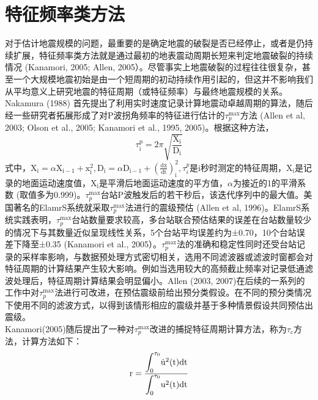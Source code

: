 \section{特征频率类方法}
\indent 对于估计地震规模的问题，最重要的是确定地震的破裂是否已经停止，或者是仍持续扩展，特征频率类方法就是通过最初的地表震动周期长短来判定地震破裂的持续情况 (Kanamori, 2005; Allen, 2005）。尽管事实上地震破裂的过程往往很复杂，甚至一个大规模地震初始是由一个短周期的初动持续作用引起的，但这并不影响我们从平均意义上研究地震的特征周期（或特征频率）与最终地震规模的关系。\\
\indent Nakamura (1988) 首先提出了利用实时速度记录计算地震动卓越周期的算法，随后经一些研究者拓展形成了对P波拐角频率的特征进行估计的$\tau_{p}^{\max }$方法 (Allen et al, 2003; Olson et al., 2005; Kanamori et al., 1995, 2005)。根据这种方法，\\
\begin{equation}
\tau_{\mathrm{i}}^{\mathrm{p}}=2 \pi \sqrt{\frac{\mathrm{X}_{\mathrm{i}}}{\mathrm{D}_{\mathrm{i}}}}
\end{equation}
式中，$\mathrm{X}_{\mathrm{i}}=\alpha \mathrm{X}_{\mathrm{i}-1}+\mathrm{x}_{\mathrm{i}}^{2}, \mathrm{D}_{\mathrm{i}}=\alpha \mathrm{D}_{\mathrm{i}-1}+\left(\frac{\mathrm{dx}}{\mathrm{dt}}\right)_{\mathrm{i}}^{2}, \tau_{i}^{p}$是i秒时测定的特征周期，$\mathrm{X}_{\mathrm{i}}$是记录的地面运动速度值，$\mathrm{X}_{\mathrm{i}}$是平滑后地面运动速度的平方值，$\alpha$为接近的1的平滑系数 (取值多为0.999)。$\tau_{p}^{\max}$台站P波触发后的若干秒后，该迭代序列中的最大值。美国著名的ElamrS系统就采取$\tau_{p}^{\max }$法进行的震级预估 (Allen et al, 1996)。ElamrS系统实践表明，$\tau_{p}^{\max}$台站数量要求较高，多台站联合预估结果的误差在台站数量较少的情况下与其数量近似呈现线性关系，5个台站平均误差约为±0.70，10个台站误差下降至±0.35 (Kanamori et al., 2005）。$\tau_{p}^{\max}$法的准确和稳定性同时还受台站记录的采样率影响，与数据预处理方式密切相关，选用不同滤波器或滤波时窗都会对特征周期的计算结果产生较大影响。例如当选用较大的高频截止频率对记录低通滤波处理后，特征周期计算结果会明显偏小。Allen (2003, 2007)在后续的一系列的工作中对$\tau_{p}^{\max}$法进行可改进，在预估震级前给出预分类假设。在不同的预分类情况下使用不同的滤波方式，以得到该情形相应的震级并基于多种情景假设共同预估出震级。\\
\indent Kanamori(2005)随后提出了一种对$\tau_{p}^{\max}$改进的捕捉特征周期计算方法，称为$\tau_{\mathrm{c}}$方法，计算方法如下：\\
\begin{equation}
\mathrm{r}=\frac{\mathlarger{\int}_{0}^{\tau_{0}} \dot{\mathrm{u}}^{2}(\mathrm{t}) \mathrm{dt}}{\mathlarger{\int}_{0}^{\tau_{0}} \mathrm{u}^{2}(\mathrm{t}) \mathrm{dt}}
\end{equation}
